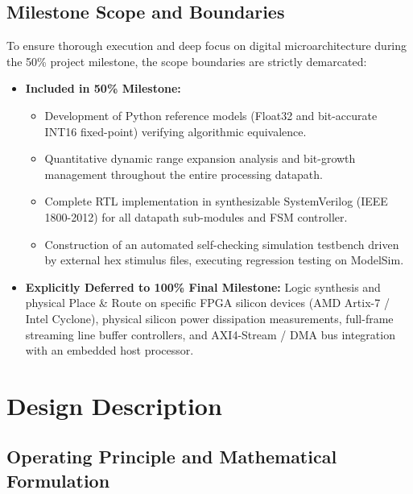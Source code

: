 \documentclass[12pt,a4paper]{article}
\begin{document}
\subsection{Milestone Scope and Boundaries}
To ensure thorough execution and deep focus on digital microarchitecture during the 50\% project milestone, the scope boundaries are strictly demarcated:
\begin{itemize}
    \item \textbf{Included in 50\% Milestone:}
    \begin{itemize}
        \item Development of Python reference models (Float32 and bit-accurate INT16 fixed-point) verifying algorithmic equivalence.
        \item Quantitative dynamic range expansion analysis and bit-growth management throughout the entire processing datapath.
        \item Complete RTL implementation in synthesizable SystemVerilog (IEEE 1800-2012) for all datapath sub-modules and FSM controller.
        \item Construction of an automated self-checking simulation testbench driven by external hex stimulus files, executing regression testing on ModelSim.
    \end{itemize}
    \item \textbf{Explicitly Deferred to 100\% Final Milestone:} Logic synthesis and physical Place \& Route on specific FPGA silicon devices (AMD Artix-7 / Intel Cyclone), physical silicon power dissipation measurements, full-frame streaming line buffer controllers, and AXI4-Stream / DMA bus integration with an embedded host processor.
\end{itemize}

\section{Design Description}
\label{sec:design_description}

\subsection{Operating Principle and Mathematical Formulation}
\label{subsec:theory}
\end{document}
